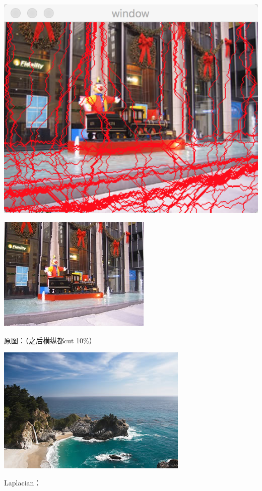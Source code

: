 \documentclass[10pt, a4paper]{article}
\begin{document}
    \includegraphics[scale = .3]{3sobelseam.png}

    \includegraphics[scale = .3]{3sobel.jpg}

    原图：（之后横纵都cut 10$\%$）

    \includegraphics[scale = .3]{4.jpg}

    Laplacian：
\end{document}
